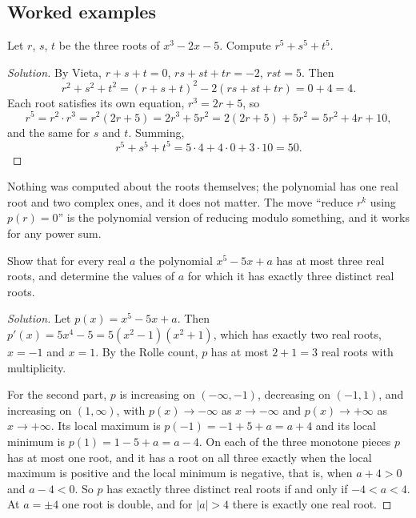\subsection*{Worked examples}

\begin{example}
Let $r$, $s$, $t$ be the three roots of $x^3 - 2x - 5$. Compute $r^5 + s^5 + t^5$.
\end{example}

\begin{proof}[Solution]
By Vieta, $r + s + t = 0$, $rs + st + tr = -2$, $rst = 5$. Then
\[
r^2 + s^2 + t^2 = (r + s + t)^2 - 2(rs + st + tr) = 0 + 4 = 4 .
\]
Each root satisfies its own equation, $r^3 = 2r + 5$, so
\[
r^5 = r^2 \cdot r^3 = r^2 (2r + 5) = 2 r^3 + 5 r^2 = 2(2r + 5) + 5 r^2 = 5 r^2 + 4 r + 10 ,
\]
and the same for $s$ and $t$. Summing,
\[
r^5 + s^5 + t^5 = 5 \cdot 4 + 4 \cdot 0 + 3 \cdot 10 = 50 .
\]
\end{proof}

Nothing was computed about the roots themselves; the polynomial has one real root and two complex ones, and it does not matter. The move ``reduce $r^k$ using $p(r) = 0$'' is the polynomial version of reducing modulo something, and it works for any power sum.

\begin{example}
Show that for every real $a$ the polynomial $x^5 - 5x + a$ has at most three real roots, and determine the values of $a$ for which it has exactly three distinct real roots.
\end{example}

\begin{proof}[Solution]
Let $p(x) = x^5 - 5x + a$. Then $p'(x) = 5x^4 - 5 = 5(x^2 - 1)(x^2 + 1)$, which has exactly two real roots, $x = -1$ and $x = 1$. By the Rolle count, $p$ has at most $2 + 1 = 3$ real roots with multiplicity.

For the second part, $p$ is increasing on $(-\infty, -1)$, decreasing on $(-1, 1)$, and increasing on $(1, \infty)$, with $p(x) \to -\infty$ as $x \to -\infty$ and $p(x) \to +\infty$ as $x \to +\infty$. Its local maximum is $p(-1) = -1 + 5 + a = a + 4$ and its local minimum is $p(1) = 1 - 5 + a = a - 4$. On each of the three monotone pieces $p$ has at most one root, and it has a root on all three exactly when the local maximum is positive and the local minimum is negative, that is, when $a + 4 > 0$ and $a - 4 < 0$. So $p$ has exactly three distinct real roots if and only if $-4 < a < 4$. At $a = \pm 4$ one root is double, and for $|a| > 4$ there is exactly one real root.
\end{proof}

